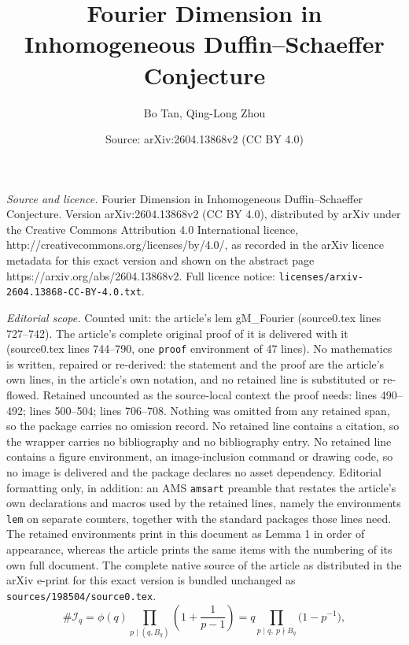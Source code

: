 \documentclass[10pt,a4paper]{amsart}
\title{Fourier Dimension in Inhomogeneous Duffin--Schaeffer Conjecture}
\author{Bo Tan, Qing-Long Zhou}
\date{Source: arXiv:2604.13868v2 (CC BY 4.0)}
\begin{document}
\maketitle

\noindent\emph{Source and licence.} Fourier Dimension in Inhomogeneous Duffin--Schaeffer Conjecture. Version arXiv:2604.13868v2 (CC BY 4.0), distributed by arXiv under the Creative Commons Attribution 4.0 International licence, http://creativecommons.org/licenses/by/4.0/, as recorded in the arXiv licence metadata for this exact version and shown on the abstract page https://arxiv.org/abs/2604.13868v2. Full licence notice: \texttt{licenses/arxiv-2604.13868-CC-BY-4.0.txt}.\par\smallskip

\noindent\textit{Editorial scope.} Counted unit: the article's lem gM\_Fourier (source0.tex lines 727--742). The article's complete original proof of it is delivered with it (source0.tex lines 744--790, one \texttt{proof} environment of 47 lines). No mathematics is written, repaired or re-derived: the statement and the proof are the article's own lines, in the article's own notation, and no retained line is substituted or re-flowed.  Retained uncounted as the source-local context the proof needs: lines 490--492; lines 500--504; lines 706--708.  Nothing was omitted from any retained span, so the package carries no omission record.  No retained line contains a citation, so the wrapper carries no bibliography and no bibliography entry.  No retained line contains a figure environment, an image-inclusion command or drawing code, so no image is delivered and the package declares no asset dependency.  Editorial formatting only, in addition: an AMS \texttt{amsart} preamble that restates the article's own declarations and macros used by the retained lines, namely the environments \texttt{lem} on separate counters, together with the standard packages those lines need.  The retained environments print in this document as Lemma 1 in order of appearance, whereas the article prints the same items with the numbering of its own full document.  The complete native source of the article as distributed in the arXiv e-print for this exact version is bundled unchanged as \texttt{sources/198504/source0.tex}.
\begin{equation}\label{cardIq}
  \# \mathcal{I}_q = \phi(q) \prod_{p \mid (q, B_q)} \left(1 + \frac{1}{p-1}\right) = q \prod_{ {p \mid q,~p \nmid B_q}} \bigl(1 - p^{-1}\bigr),
\end{equation}
\end{document}
